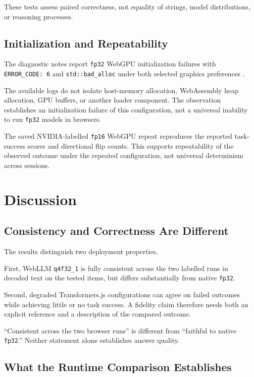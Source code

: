 \documentclass[conference]{IEEEtran}
\newcommand{\fp}{\texttt{fp32}}
\newcommand{\fphalf}{\texttt{fp16}}
\newcommand{\mlcfull}{\texttt{q4f32\_1}}
\begin{document}
These tests assess paired correctness, not equality of
strings, model distributions, or reasoning processes.


\subsection{Initialization and Repeatability}

The diagnostic notes report \fp{} WebGPU initialization
failures with \texttt{ERROR\_CODE: 6} and
\texttt{std::bad\_alloc} under both selected graphics
preferences \cite{repository}.

The available logs do not isolate host-memory allocation,
WebAssembly heap allocation, GPU buffers, or another loader
component.
The observation establishes an initialization failure of
this configuration, not a universal inability to run \fp{}
models in browsers.

The saved NVIDIA-labelled \fphalf{} WebGPU repeat reproduces
the reported task-success scores and directional flip
counts.
This supports repeatability of the observed outcome under
the repeated configuration, not universal determinism
across sessions.


\section{Discussion}
\label{sec:discussion}

\subsection{Consistency and Correctness Are Different}

The results distinguish two deployment properties.

First, WebLLM \mlcfull{} is fully consistent across the two
labelled runs in decoded text on the tested items,
but differs substantially from native \fp{}.

Second, degraded Transformers.js configurations can agree
on failed outcomes while achieving little or no task
success.
A fidelity claim therefore needs both an explicit reference
and a description of the compared outcome.

``Consistent across the two browser runs'' is different
from ``faithful to native \fp{}.''
Neither statement alone establishes answer quality.


\subsection{What the Runtime Comparison Establishes}
\end{document}
